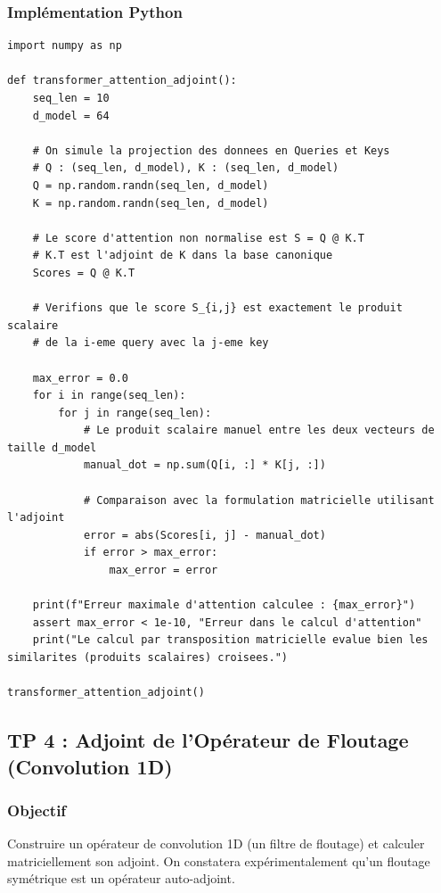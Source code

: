 \documentclass[11pt,a4paper]{article}
\begin{document}
\subsubsection*{Implémentation Python}
\begin{lstlisting}
import numpy as np

def transformer_attention_adjoint():
    seq_len = 10
    d_model = 64

    # On simule la projection des donnees en Queries et Keys
    # Q : (seq_len, d_model), K : (seq_len, d_model)
    Q = np.random.randn(seq_len, d_model)
    K = np.random.randn(seq_len, d_model)

    # Le score d'attention non normalise est S = Q @ K.T
    # K.T est l'adjoint de K dans la base canonique
    Scores = Q @ K.T

    # Verifions que le score S_{i,j} est exactement le produit scalaire
    # de la i-eme query avec la j-eme key

    max_error = 0.0
    for i in range(seq_len):
        for j in range(seq_len):
            # Le produit scalaire manuel entre les deux vecteurs de taille d_model
            manual_dot = np.sum(Q[i, :] * K[j, :])

            # Comparaison avec la formulation matricielle utilisant l'adjoint
            error = abs(Scores[i, j] - manual_dot)
            if error > max_error:
                max_error = error

    print(f"Erreur maximale d'attention calculee : {max_error}")
    assert max_error < 1e-10, "Erreur dans le calcul d'attention"
    print("Le calcul par transposition matricielle evalue bien les similarites (produits scalaires) croisees.")

transformer_attention_adjoint()
\end{lstlisting}


\subsection*{TP 4 : Adjoint de l'Opérateur de Floutage (Convolution 1D)}
\subsubsection*{Objectif}
Construire un opérateur de convolution 1D (un filtre de floutage) et calculer matriciellement son adjoint. On constatera expérimentalement qu'un floutage symétrique est un opérateur auto-adjoint.
\end{document}
